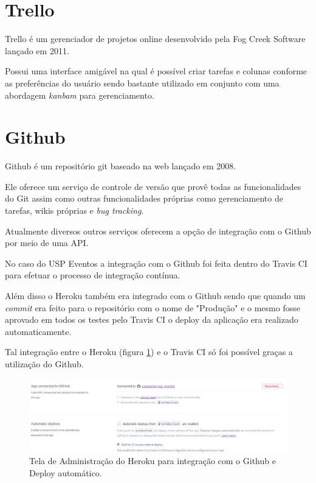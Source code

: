 \section{Trello}
\par Trello é um gerenciador de projetos online desenvolvido pela Fog Creek Software lançado em 2011.
\par Possui uma interface amigável na qual é possível criar tarefas e colunas conforme as preferências do usuário sendo bastante utilizado em conjunto com uma abordagem \emph{kanbam} para gerenciamento.

\section{Github}
\par Github é um repositório git baseado na web lançado em 2008.
\par Ele oferece um serviço de controle de versão que provê todas as funcionalidades do Git assim como outras funcionalidades próprias como gerenciamento de tarefas, wikis próprias e \emph{bug tracking}.
\par Atualmente diversos outros serviços oferecem a opção de integração com o Github por meio de uma API.
\par No caso do USP Eventos a integração com o Github foi feita dentro do Travis CI para efetuar o processo de integração contínua.
\par Além disso o Heroku também era integrado com o Github sendo que quando um \emph{commit} era feito para o repositório com o nome de "Produção" e o mesmo fosse aprovado em todos os testes pelo Travis CI o deploy da aplicação era realizado automaticamente.
\par Tal integração entre o Heroku (figura \ref{fig:heroku_automatic_deploy}) e o Travis CI só foi possível graças a utilização do Github.
\begin{figure}[htb]
\centering
\includegraphics[width=15cm]{figuras/heroku_automatic_deploy}
\caption{\label{fig:heroku_automatic_deploy} Tela de Administração do Heroku para integração com o Github e Deploy automático.}
\end{figure}
